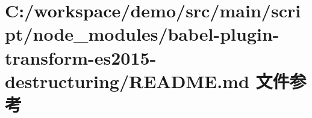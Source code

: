 \hypertarget{node__modules_2babel-plugin-transform-es2015-destructuring_2_r_e_a_d_m_e_8md}{}\section{C\+:/workspace/demo/src/main/script/node\+\_\+modules/babel-\/plugin-\/transform-\/es2015-\/destructuring/\+R\+E\+A\+D\+ME.md 文件参考}
\label{node__modules_2babel-plugin-transform-es2015-destructuring_2_r_e_a_d_m_e_8md}
